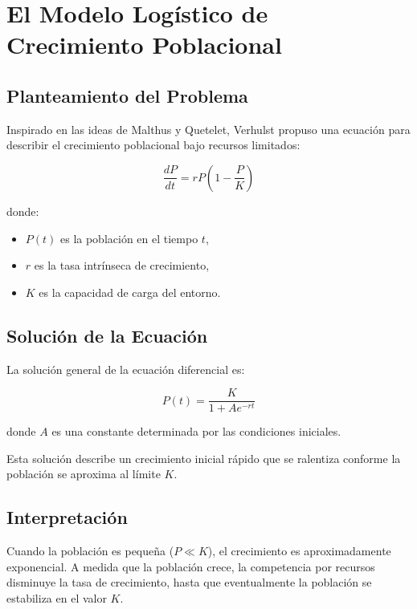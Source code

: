 \documentclass[12pt]{article}
\begin{document}
\section{El Modelo Logístico de Crecimiento Poblacional}

\subsection{Planteamiento del Problema}

Inspirado en las ideas de Malthus y Quetelet, Verhulst propuso una ecuación para describir el crecimiento poblacional bajo recursos limitados:

\begin{equation}
\frac{dP}{dt} = r P \left( 1 - \frac{P}{K} \right)
\end{equation}

donde:
\begin{itemize}
    \item \( P(t) \) es la población en el tiempo \( t \),
    \item \( r \) es la tasa intrínseca de crecimiento,
    \item \( K \) es la capacidad de carga del entorno.
\end{itemize}

\subsection{Solución de la Ecuación}

La solución general de la ecuación diferencial es:

\begin{equation}
P(t) = \frac{K}{1 + A e^{-r t}}
\end{equation}

donde \( A \) es una constante determinada por las condiciones iniciales.

Esta solución describe un crecimiento inicial rápido que se ralentiza conforme la población se aproxima al límite \( K \).

\subsection{Interpretación}

Cuando la población es pequeña (\( P \ll K \)), el crecimiento es aproximadamente exponencial. A medida que la población crece, la competencia por recursos disminuye la tasa de crecimiento, hasta que eventualmente la población se estabiliza en el valor \( K \).
\end{document}
